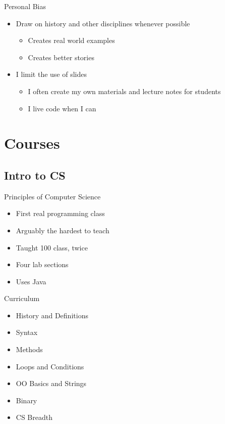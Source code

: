 \documentclass[11pt]{beamer}
\begin{document}
\begin{frame}{Personal Bias}
	\begin{itemize}
		\item Draw on history and other disciplines whenever possible
		\pause 
		\begin{itemize}
			\item Creates real world examples
			\item Creates better stories
		\end{itemize}
		\pause
		\item I limit the use of slides
		\begin{itemize}
			\item I often create my own materials and lecture notes for students
			\item I live code when I can
		\end{itemize}
	\end{itemize}
\end{frame}

\section{Courses}

\subsection{Intro to CS}
\begin{frame}{Principles of Computer Science}
	\begin{itemize}
		\item First real programming class
		\item Arguably the hardest to teach
		\item Taught 100 class, twice 
		\item Four lab sections
		\item Uses Java
	\end{itemize}
\end{frame}



\begin{frame}{Curriculum}
	\begin{itemize}
		\item History and Definitions
		\item Syntax
		\item Methods
		\item Loops and Conditions
		\item OO Basics and Strings
		\item Binary
		\item CS Breadth
	\end{itemize}
\end{frame}
\end{document}
